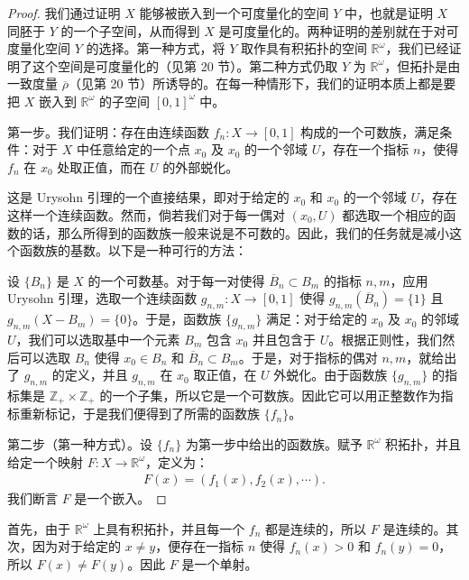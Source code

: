 \begin{proof}
我们通过证明 $X$ 能够被嵌入到一个可度量化的空间 $Y$ 中，也就是证明 $X$ 同胚于 $Y$ 的一个子空间，从而得到 $X$ 是可度量化的。两种证明的差别就在于对可度量化空间 $Y$ 的选择。第一种方式，将 $Y$ 取作具有积拓扑的空间 $\mathbb{R}^{\omega}$，我们已经证明了这个空间是可度量化的（见第 20 节）。第二种方式仍取 $Y$ 为 $\mathbb{R}^{\omega}$，但拓扑是由一致度量 $\overline{\rho}$（见第 20 节）所诱导的。在每一种情形下，我们的证明本质上都是要把 $X$ 嵌入到 $\mathbb{R}^{\omega}$ 的子空间 $[0,1]^{\omega}$ 中。

第一步。我们证明：存在由连续函数 $f_{n}\colon X\to[0,1]$ 构成的一个可数族，满足条件：对于 $X$ 中任意给定的一个点 $x_{0}$ 及 $x_{0}$ 的一个邻域 $U$，存在一个指标 $n$，使得 $f_{n}$ 在 $x_{0}$ 处取正值，而在 $U$ 的外部蜕化。

这是 Urysohn 引理的一个直接结果，即对于给定的 $x_{0}$ 和 $x_{0}$ 的一个邻域 $U$，存在这样一个连续函数。然而，倘若我们对于每一偶对 $(x_{0},U)$ 都选取一个相应的函数的话，那么所得到的函数族一般来说是不可数的。因此，我们的任务就是减小这个函数族的基数。以下是一种可行的方法：

设 $\{B_{n}\}$ 是 $X$ 的一个可数基。对于每一对使得 $\overline{B}_{n}\subset B_{m}$ 的指标 $n,m$，应用 Urysohn 引理，选取一个连续函数 $g_{n,m}\colon X\to[0,1]$ 使得 $g_{n,m}(\overline{B}_{n})=\{1\}$ 且 $g_{n,m}(X-B_{m})=\{0\}$。于是，函数族 $\{g_{n,m}\}$ 满足：对于给定的 $x_{0}$ 及 $x_{0}$ 的邻域 $U$，我们可以选取基中一个元素 $B_{m}$ 包含 $x_{0}$ 并且包含于 $U$。根据正则性，我们然后可以选取 $B_{n}$ 使得 $x_{0}\in B_{n}$ 和 $\overline{B}_{n}\subset B_{m}$。于是，对于指标的偶对 $n,m$，就给出了 $g_{n,m}$ 的定义，并且 $g_{n,m}$ 在 $x_{0}$ 取正值，在 $U$ 外蜕化。由于函数族 $\{g_{n,m}\}$ 的指标集是 $\mathbb{Z}_{+}\times\mathbb{Z}_{+}$ 的一个子集，所以它是一个可数族。因此它可以用正整数作为指标重新标记，于是我们便得到了所需的函数族 $\{f_{n}\}$。

第二步（第一种方式）。设 $\{f_{n}\}$ 为第一步中给出的函数族。赋予 $\mathbb{R}^{\omega}$ 积拓扑，并且给定一个映射 $F\colon X\to\mathbb{R}^{\omega}$，定义为：
\begin{align*}
F(x)=(f_{1}(x),f_{2}(x),\cdots).
\end{align*}
我们断言 $F$ 是一个嵌入。
\end{proof}

首先，由于 $\mathbb{R}^{\omega}$ 上具有积拓扑，并且每一个 $f_{n}$ 都是连续的，所以 $F$ 是连续的。其次，因为对于给定的 $x\neq y$，便存在一指标 $n$ 使得 $f_{n}(x)>0$ 和 $f_{n}(y)=0$，所以 $F(x)\neq F(y)$。因此 $F$ 是一个单射。

